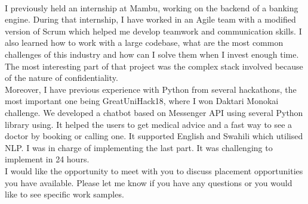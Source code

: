 \documentclass[12pt, a4paper]{awesome-cv}
\begin{document}
\begin{cvletter}
\\ \newline
I previously held an internship at Mambu, working on the backend of a banking engine. During that internship, I have worked in an Agile team with a modified version of Scrum which helped me develop teamwork and communication skills. I also learned how to work with a large codebase, what are the most common challenges of this industry and how can I solve them when I invest enough time. The most interesting part of that project was the complex stack involved because of the nature of confidentiality. \\
Moreover, I have previous experience with Python from several hackathons, the most important one being GreatUniHack18, where I won Daktari Monokai challenge. We developed a chatbot based on Messenger API using several Python library using. It helped the users to get medical advice and a fast way to see a doctor by booking or calling one. It supported English and Swahili which utilised NLP. I was in charge of implementing the last part. It was challenging to implement in 24 hours. 
\\ \newline
I would like the opportunity to meet with you to discuss placement opportunities you have available. Please let me know if you have any questions or you would like to see specific work samples.

\end{cvletter}

\makeletterclosing
\end{document}
